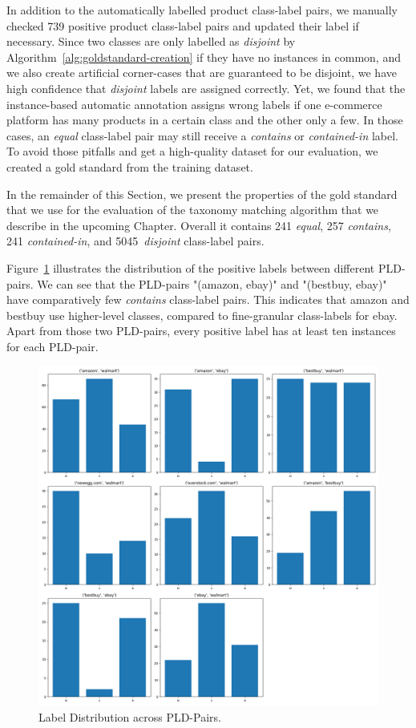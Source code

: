 In addition to the automatically labelled product class-label pairs, we manually checked 739 positive product class-label
pairs and updated their label if necessary.
Since two classes are only labelled as \emph{disjoint} by Algorithm~\ref{alg:goldstandard-creation} if they have no instances
in common, and we also create artificial corner-cases that are guaranteed to be disjoint, we have high confidence
that \emph{disjoint} labels are assigned correctly.
Yet, we found that the instance-based automatic annotation assigns wrong labels if one e-commerce platform has many
products in a certain class and the other only a few.
In those cases, an \emph{equal} class-label pair may still receive a \emph{contains} or \emph{contained-in} label.
To avoid those pitfalls and get a high-quality dataset for our evaluation, we created a gold standard from the training
dataset.

In the remainder of this Section, we present the properties of the gold standard that we use for the evaluation of
the taxonomy matching algorithm that we describe in the upcoming Chapter.
Overall it contains 241 \emph{equal}, 257 \emph{contains}, 241 \emph{contained-in}, and 5045~\emph{disjoint} class-label
pairs.

Figure~\ref{fig:label-distribution} illustrates the distribution of the positive labels between different PLD-pairs.
We can see that the PLD-pairs "(amazon, ebay)" and "(bestbuy, ebay)" have comparatively few \emph{contains} class-label
pairs.
This indicates that amazon and bestbuy use higher-level classes, compared to fine-granular class-labels for ebay.
Apart from those two PLD-pairs, every positive label has at least ten instances for each PLD-pair.
\begin{figure}[!htbp]
	\centering
	\includegraphics[width=13cm]{images/label-distribution.png}
	\caption{Label Distribution across PLD-Pairs.}
	\label{fig:label-distribution}
\end{figure}

